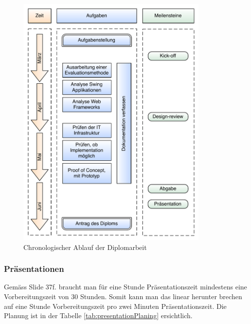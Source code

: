   \begin{figure}[p]
    \begin{center}
      \includegraphics[width=0.85\textwidth]{./image/grobplanung.pdf}
      \caption{Chronologischer Ablauf der Diplomarbeit}
      \label{img:grobplanung}
    \end{center}
  \end{figure}
  
  \subsubsection{Präsentationen}
  
  Gemäss \cite{KillerPresentation} Slide 37f. braucht man für eine Stunde
  Präsentationszeit mindestens eine Vorbereitungszeit von 30 Stunden. Somit kann
  man das linear herunter brechen auf eine Stunde Vorbereitungszeit pro zwei
  Minuten Präsentationszeit. Die Planung ist in der Tabelle
  \ref{tab:presentationPlaning} ersichtlich.
  \newline
  
